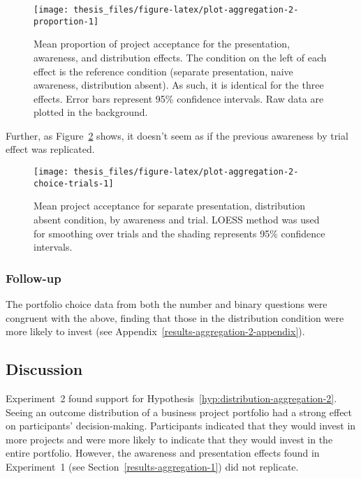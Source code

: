 \documentclass[a4paper, nobind]{templates/ociamthesis}
\theoremstyle{definition}
\theoremstyle{definition}
\theoremstyle{definition}
\theoremstyle{definition}
\theoremstyle{remark}
\begin{document}
\begin{figure}
\texttt{[image: thesis\_files/figure-latex/plot-aggregation-2-proportion-1]} \caption{Mean proportion of project acceptance for the presentation, awareness, and distribution effects. The condition on the left of each effect is the reference condition (separate presentation, naive awareness, distribution absent). As such, it is identical for the three effects. Error bars represent 95\% confidence intervals. Raw data are plotted in the background.}\label{fig:plot-aggregation-2-proportion}
\end{figure}

Further, as Figure~\ref{fig:plot-aggregation-2-choice-trials} shows, it
doesn't seem as if the previous awareness by trial effect was replicated.



\begin{figure}
\texttt{[image: thesis\_files/figure-latex/plot-aggregation-2-choice-trials-1]} \caption{Mean project acceptance for separate presentation, distribution absent condition, by awareness and trial. LOESS method was used for smoothing over trials and the shading represents 95\% confidence intervals.}\label{fig:plot-aggregation-2-choice-trials}
\end{figure}

\subsubsection{Follow-up}

The portfolio choice data from both the number and binary questions were
congruent with the above, finding that those in the distribution condition were
more likely to invest (see Appendix~\ref{results-aggregation-2-appendix}).

\hypertarget{discussion-aggregation-4}{%
\subsection{Discussion}\label{discussion-aggregation-4}}

Experiment~2 found support for
Hypothesis~\ref{hyp:distribution-aggregation-2}. Seeing an outcome
distribution of a business project portfolio had a strong effect on
participants' decision-making. Participants indicated that they would invest in
more projects and were more likely to indicate that they would invest in the
entire portfolio. However, the awareness and presentation effects found in
Experiment~1 (see Section~\ref{results-aggregation-1}) did not replicate.
\end{document}
